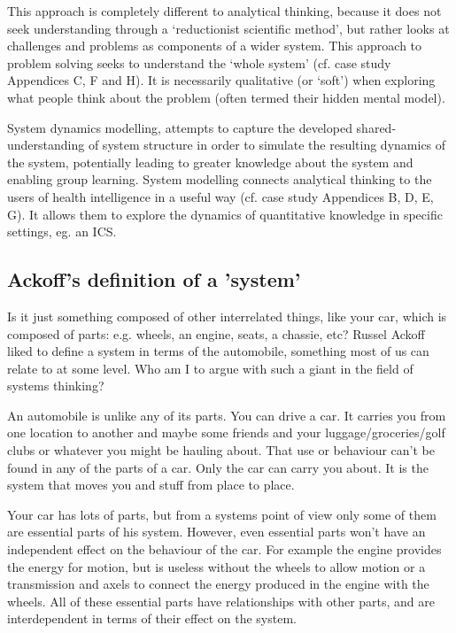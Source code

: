 This approach is completely different to analytical thinking, because it does not seek understanding through a ‘reductionist scientific method’, but rather looks at challenges and problems as components of a wider system. This approach to problem solving seeks to understand the ‘whole system’ (cf. case study Appendices C, F and H). It is necessarily qualitative (or ‘soft’) when exploring what people think about the problem (often termed their hidden mental model).

System dynamics modelling, attempts to capture the developed shared-understanding of system structure in order to simulate the resulting dynamics of the system, potentially leading to greater knowledge about the system and enabling group learning. System modelling connects analytical thinking to the users of health intelligence in a useful way (cf. case study Appendices B, D, E, G). It allows them to explore the dynamics of quantitative knowledge in specific settings, eg. an ICS.

\subsection{Ackoff's definition of a 'system'}

Is it just something composed of other interrelated things, like your car, which is composed of parts: e.g. wheels, an engine, seats, a chassie, etc? Russel Ackoff liked to define a system in terms of the automobile, something most of us can relate to at some level. Who am I to argue with such a giant in the field of systems thinking?

An automobile is unlike any of its parts. You can drive a car. It carries you from one location to another and maybe some friends and your luggage/groceries/golf clubs or whatever you might be hauling about. That use or behaviour can't be found in any of the parts of a car. Only the car can carry you about. It is the system that moves you and stuff from place to place.

Your car has lots of parts, but from a systems point of view only some of them are essential parts of his system. However, even essential parts won't have an independent effect on the behaviour of the car. For example the engine provides the energy for motion, but is useless without the wheels to allow motion or a transmission and axels to connect the energy produced in the engine with the wheels. All of these essential parts have relationships with other parts, and are interdependent in terms of their effect on the system.

